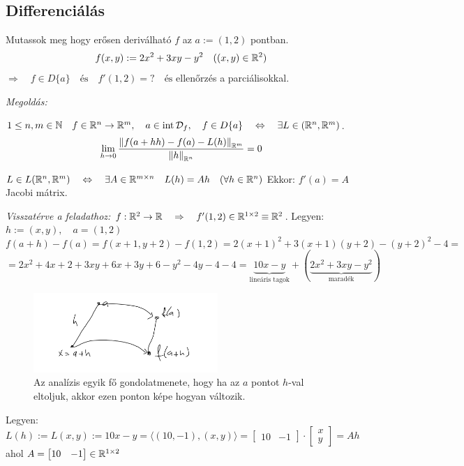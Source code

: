 \documentclass[a4paper,11.5pt]{article}
\DeclareMathOperator{\Int}{int}
\newcommand{\norm}[1]{\left\lVert#1\right\rVert}
\begin{document}
	\subsection{Differenciálás}
	\begin{task} 
		Mutassok meg hogy erősen deriválható $f$ az $a:=(1,2)$ pontban.
		\[ f(x,y):=2x^2+3xy-y^2 \quad ((x,y)\in\mathbb{R}^2) \]
		$\Rightarrow\quad f\in D\{a\}\quad \text{és}\quad f'(1,2)=?\quad \text{és}$ ellenőrzés a parciálisokkal.
		
		\textit{Megoldás:}
		\begin{revision}
			$1\leq n,m\in\N\quad f\in\R^n\to\R^m,\quad a\in \Int \mathcal{D}_f,\quad f\in D\{ a \}\quad \Leftrightarrow \quad \exists L\in\LARGE(\R^n,\R^m)$.
			\[ \lim_{h\to0} \frac{\norm{f(a+hh)-f(a)-L(h)}_{\R^m}}{\norm{h}_{\R^n}}=0 \]
		\end{revision}
		\begin{revision}
			$L\in L(\mathbb{R}^n,\mathbb{R}^m)\quad \Leftrightarrow\quad \exists A\in\mathbb{R}^{m\times n}\quad L(h)=Ah\quad (\forall h\in\mathbb{R}^n)$
		 Ekkor: $f'(a)=A$ Jacobi mátrix.
		\end{revision}
		\textit{Visszatérve a feladathoz:} $f:\mathbb{R}^2\to\mathbb{R}\quad \Rightarrow\quad f'(1,2)\in\mathbb{R}^{1\times 2}\equiv \mathbb{R}{^2}$.\quad 
		Legyen: $h:=(x,y),\quad a=(1,2)$
		\[ f(a+h)-f(a)=f(x+1,y+2)-f(1,2)=2(x+1)^2+3(x+1)(y+2)-(y+2)^2-4=\]\[=2x^2+4x+2+3xy+6x+3y+6-y^2-4y-4-4=\underbrace{10x-y}_{\text{lineáris tagok}}+(\underbrace{2x^2+3xy-y^2}_{\text{maradék}}) \]
		\begin{figure}[H]
			\centering
			\includegraphics[height=3cm]{kepek/28.png}
			\caption{Az analízis egyik fő gondolatmenete, hogy ha az $a$ pontot $h$-val eltoljuk, akkor ezen ponton képe hogyan változik.}
		\end{figure}
		Legyen: $L(h):=L(x,y):=10x-y=\langle(10,-1),(x,y)\rangle=\begin{bmatrix}
			10&-1
		\end{bmatrix}\cdot \begin{bmatrix}
			x\\y
		\end{bmatrix} =Ah$ ahol $A=\begin{bmatrix}
		10&-1
		\end{bmatrix}\in\mathbb{R}^{1\times2}$
		

\end{task}
\end{document}
